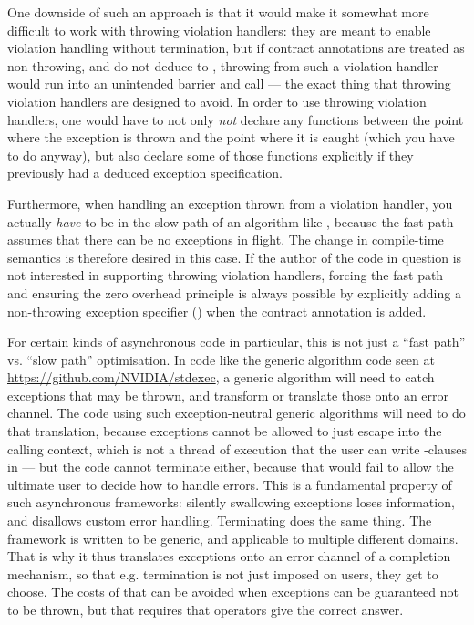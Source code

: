 One downside of such an approach is that it would make it somewhat more difficult to work with throwing violation handlers: they are meant to enable violation handling without termination, but if contract annotations are treated as non-throwing, and do not deduce to , throwing from such a violation handler would run into an unintended  barrier and call  --- the exact thing that throwing violation handlers are designed to avoid. In order to use throwing violation handlers, one would have to not only \emph{not} declare any functions between the point where the exception is thrown and the point where it is caught  (which you have to do anyway), but also declare some of those functions explicitly  if they previously had a deduced exception specification.

Furthermore, when handling an exception thrown from a violation handler, you actually \emph{have} to be in the slow path of an algorithm like , because the fast path assumes that there can be no exceptions in flight. The change in compile-time semantics is therefore desired in this case. If the author of the code in question is not interested in supporting throwing violation handlers, forcing the fast path and ensuring the zero overhead principle is always possible by explicitly adding a non-throwing exception specifier () when the contract annotation is added.

For certain kinds of asynchronous code in particular, this is not just a ``fast path'' vs. ``slow path'' optimisation. In code like the generic algorithm code seen at \href{https://github.com/NVIDIA/stdexec}{https://github.com/NVIDIA/stdexec}, a generic algorithm will need to catch exceptions that may be thrown, and transform or translate those onto an error channel. The code using such  exception-neutral generic algorithms will need to do that translation, because exceptions cannot be allowed to just escape into the calling context, which is not a thread of execution that the user can write -clauses in --- but the code cannot terminate either, because that would fail to allow the ultimate user to decide how to handle errors. This is a fundamental property of such asynchronous frameworks: silently swallowing exceptions loses information, and disallows custom error handling. Terminating does the same thing. The framework is written to be generic, and applicable to multiple different domains. That is why it thus translates exceptions onto an error channel of a completion mechanism, so that e.g. termination is not just imposed on users, they get to choose. The costs of that can be avoided when exceptions can be guaranteed not to be thrown, but that requires that  operators give the correct answer.

